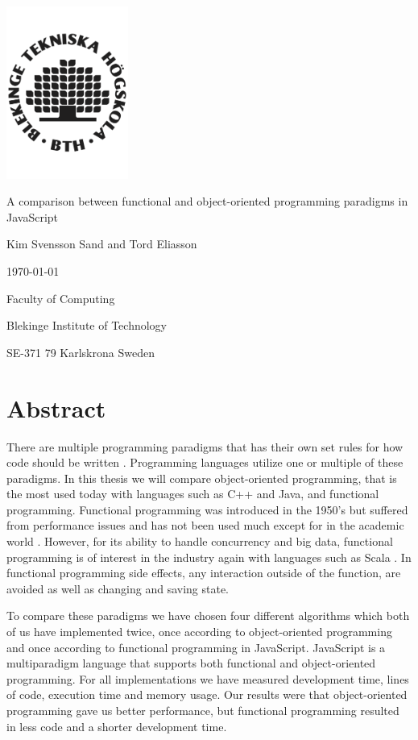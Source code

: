 \documentclass {article}
\begin{document}
\begin{titlepage}
	\centering
	\includegraphics[width=0.3\textwidth]{bth-logo} \par
	{\LARGE A comparison between functional and object-oriented programming paradigms in JavaScript \par}
	\vspace{1cm}
{\large Kim Svensson Sand and Tord Eliasson \par}
{\large \today \par}
	\vfill

	{\normalsize Faculty of Computing \par}
	{\normalsize Blekinge Institute of Technology \par}
	{\normalsize SE-371 79 Karlskrona Sweden \par}
\end{titlepage}
\newpage
\section*{Abstract}
There are multiple programming paradigms that has their own set rules for how code should be written \cite{programming-paradigms}. Programming languages utilize one or multiple of these paradigms. In this thesis we will compare object-oriented programming, that is the most used today with languages such as C++ and Java, and functional programming. Functional programming was introduced in the 1950's but suffered from performance issues and has not been used much except for in the academic world \cite{gabmar}. However, for its ability to handle concurrency and big data, functional programming is of interest in the industry again with languages such as Scala \cite{meijer, eriksen}. In functional programming side effects, any interaction outside of the function, are avoided as well as changing and saving state. 

To compare these paradigms we have chosen four different algorithms which both of us have implemented twice, once according to object-oriented programming and once according to functional programming in JavaScript. JavaScript is a multiparadigm language that supports both functional and object-oriented programming. For all implementations we have measured development time, lines of code, execution time and memory usage. Our results were that object-oriented programming gave us better performance, but functional programming resulted in less code and a shorter development time. 
\end{document}
